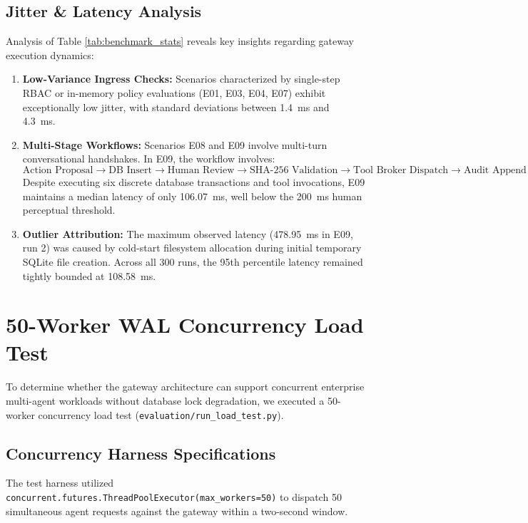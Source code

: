 \subsection{Jitter \& Latency Analysis}
Analysis of Table \ref{tab:benchmark_stats} reveals key insights regarding gateway execution dynamics:
\begin{enumerate}
    \item \textbf{Low-Variance Ingress Checks:} Scenarios characterized by single-step RBAC or in-memory policy evaluations (E01, E03, E04, E07) exhibit exceptionally low jitter, with standard deviations between 1.4~ms and 4.3~ms.
    \item \textbf{Multi-Stage Workflows:} Scenarios E08 and E09 involve multi-turn conversational handshakes. In E09, the workflow involves:
    \begin{equation*}
    \text{Action Proposal} \to \text{DB Insert} \to \text{Human Review} \to \text{SHA-256 Validation} \to \text{Tool Broker Dispatch} \to \text{Audit Append}
    \end{equation*}
    Despite executing six discrete database transactions and tool invocations, E09 maintains a median latency of only 106.07~ms, well below the 200~ms human perceptual threshold.
    \item \textbf{Outlier Attribution:} The maximum observed latency (478.95~ms in E09, run 2) was caused by cold-start filesystem allocation during initial temporary SQLite file creation. Across all 300 runs, the 95th percentile latency remained tightly bounded at 108.58~ms.
\end{enumerate}

\section{50-Worker WAL Concurrency Load Test}
To determine whether the gateway architecture can support concurrent enterprise multi-agent workloads without database lock degradation, we executed a 50-worker concurrency load test (\texttt{evaluation/run\_load\_test.py}).

\subsection{Concurrency Harness Specifications}
The test harness utilized \texttt{concurrent.futures.ThreadPoolExecutor(max\_workers=50)} to dispatch 50 simultaneous agent requests against the gateway within a two-second window.

